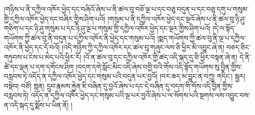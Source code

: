 །གཉིས་པ་ནི་དཀྱིལ་འཁོར་ཕྱེད་དང་བཞིའོ་ཞེས་པ་ནི་ཚལ་བུ་བཅོ་ལྔ་པ་དང་བཅུ་བདུན་པ་དང་བཅུ་དགུ་པ་གསུམ་གྱི་དཀྱིལ་འཁོར་ཕྱེད་དང་བཞིར་གྱིས་ཤིག་པའོ། །གསུམ་པ་ནི་དཀྱིལ་འཁོར་ཕྱེད་དང་ལྔའོ་ཞེས་པ་ནི་ཚལ་བུ་ཉི་ཤུ་གཅིག་པ་དང་ཉི་ཤུ་གསུམ་པ་དང་ཉི་ཤུ་ལྔ་པ་གསུམ་གྱི་དཀྱིལ་འཁོར་ཕྱེད་དང་ལྔར་གྱིས་ཤིག་པའོ། །དེ་ལ་སྟོད་གཡོགས་ཀྱི་ཚལ་བུ་ནི་བདུན་པ་དཀྱིལ་འཁོར་ནི་ཕྱེད་དང་གསུམ་པའོ། །སྨད་གཡོགས་ཀྱི་ཚལ་བུ་ནི་ལྔ་པ་དཀྱིལ་འཁོར་ནི་ཕྱེད་དང་དོ་བའོ། །འདི་གཉིས་ཀྱི་དཀྱིལ་འཁོར་དང་ཚལ་བུ་གཞུང་ལས་ཅི་ཕྱིར་མི་འབྱུང་ཞེ་ན། བཅད་ཅིང་གཏུབས་པ་ངེས་པ་མེད་པའི་ཕྱིར་རོ། །འོ་ན་ཚལ་བུ་དང་དཀྱིལ་འཁོར་གྱི་ཚད་འདི་སྐད་དུ་ཅི་ཕྱིར་བསྟན་ཞེ་ན། དེ་ནི་ཚེ་དང་ལྡན་པ་དག་དགོངས་ཤིག །བདག་དགེ་སློང་མིང་འདི་ཞེས་བགྱི་བའི་གོས་འདི་སྟོད་གཡོགས་སུ་བྱིན་གྱིས་བརླབས་ཏེ་འདོད་ན་དཀྱིལ་འཁོར་ཕྱེད་དང་གསུམ་པའི་བདུན་པར་བྱའོ། །བར་ཆད་མ་བྱུང་ན་བཀྲུ། གདིང་། སྦྱར། བསྡེབ། བཙོ། གླན། དྲུབ་རྣམས་རྐྱེན་ཇི་བཞིན་དུ་བྱའོ་ཞེས་པ་དང་དེ་བཞིན་དུ་བདག་གི་གོས་འདི་བྱིན་གྱིས་བརླབས་ཏེ། འདོད་ན་དཀྱིལ་འཁོར་ཕྱེད་དང་གསུམ་པའི་ལྔ་པར་བྱའོ་ཞེས་པ་ལ་སོགས་པའི་སྔགས་ལས་འབྱུང་བས་ན་འདི་སྐད་དུ་སྨོས་པ་ཡིན་ནོ། །

